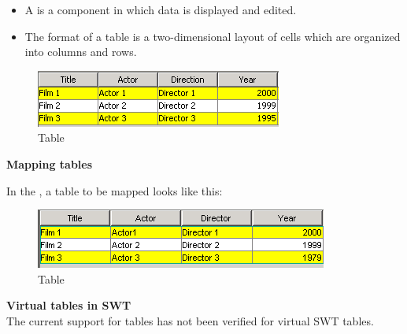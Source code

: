 \begin{itemize}
\item A  is a component in which data is displayed and edited. 
\item The format of a table is a two-dimensional layout of cells which are organized into columns and rows.
\end{itemize}


\begin{figure}
\begin{center}
\includegraphics{PS/Table}
\caption{Table}
\label{table}
\end{center}
\end{figure}

\textbf{Mapping tables}

In the \gdomm{}, a table to be mapped looks like this:

\begin{figure}
\begin{center}
\includegraphics{PS/Maptable}
\caption{Table}
\label{maptable}
\end{center}
\end{figure}

\textbf{Virtual tables in SWT}\\
The current support for tables has not been verified for virtual SWT tables.
